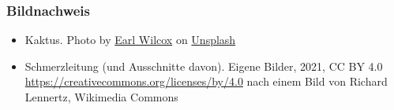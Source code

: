 \documentclass{beamer}
\begin{document}
\begin{frame}
 
\frametitle{Bildnachweis}
 
\begin{tiny}
  

\begin{itemize}
\item
Kaktus. Photo by \href{https://unsplash.com/@earl_plannerzone?utm_source=unsplash&utm_medium=referral&utm_content=creditCopyText}{Earl Wilcox} on \href{https://unsplash.com/s/photos/pain?utm_source=unsplash&utm_medium=referral&utm_content=creditCopyText}{Unsplash}
\item
Schmerzleitung (und Ausschnitte davon). Eigene Bilder, 2021, CC BY 4.0 \url{https://creativecommons.org/licenses/by/4.0} nach einem Bild von Richard Lennertz,  Wikimedia Commons
\end{itemize}

\end{tiny}

\end{frame}
\end{document}
